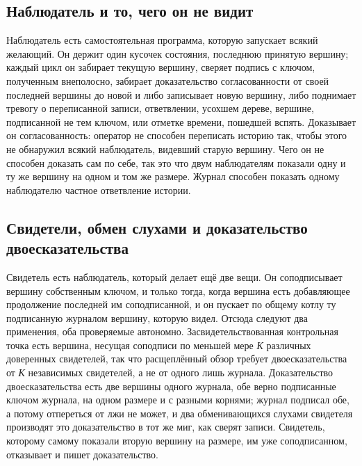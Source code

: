 \subsection{Наблюдатель и то, чего он не видит}

Наблюдатель есть самостоятельная программа, которую запускает всякий желающий. Он держит один
кусочек состояния, последнюю принятую вершину; каждый цикл он забирает текущую вершину, сверяет
подпись с ключом, полученным внеполосно, забирает доказательство согласованности от своей последней
вершины до новой и либо записывает новую вершину, либо поднимает тревогу о переписанной записи,
ответвлении, усохшем дереве, вершине, подписанной не тем ключом, или отметке времени, пошедшей
вспять. Доказывает он согласованность: оператор не способен переписать историю так, чтобы этого не
обнаружил всякий наблюдатель, видевший старую вершину. Чего он не способен доказать сам по себе,
так это что двум наблюдателям показали одну и ту же вершину на одном и том же размере. Журнал
способен показать одному наблюдателю частное ответвление истории. \sImpl

\subsection{Свидетели, обмен слухами и доказательство двоесказательства}


Свидетель есть наблюдатель, который делает ещё две вещи. Он соподписывает вершину собственным
ключом, и только тогда, когда вершина есть добавляющее продолжение последней им соподписанной, и
он пускает по общему котлу ту подписанную журналом вершину, которую видел. Отсюда следуют два
применения, оба проверяемые автономно. Засвидетельствованная контрольная точка есть вершина,
несущая соподписи по меньшей мере \textit{К} различных доверенных свидетелей, так что расщеплённый обзор
требует двоесказательства от \textit{К} независимых свидетелей, а не от одного лишь журнала.
Доказательство двоесказательства есть две вершины одного журнала, обе верно подписанные ключом
журнала, на одном размере и с разными корнями; журнал подписал обе, а потому отпереться от лжи не
может, и два обменивающихся слухами свидетеля производят это доказательство в тот же миг, как
сверят записи. Свидетель, которому самому показали вторую вершину на размере, им уже
соподписанном, отказывает и пишет доказательство. \sImpl

